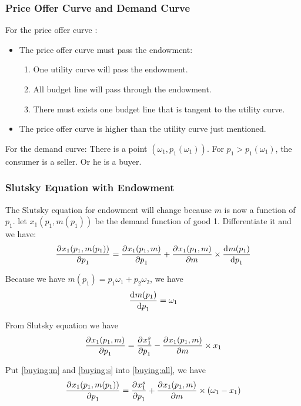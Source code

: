 \subsubsection{Price Offer Curve and Demand Curve}

For the price offer curve :
\begin{itemize}
    \item The price offer curve must pass the endowment:
        \begin{enumerate}
            \item One utility curve will pass the endowment.
            \item All budget line will pass through the endowment.
            \item There must exists one budget line that is tangent to the utility curve.
        \end{enumerate}
    \item The price offer curve is higher than the utility curve just mentioned.
\end{itemize}

For the demand curve: There is a point $(\omega_1, p_1(\omega_1))$. For $p_1 > p_1(\omega_1)$, the consumer is a seller. Or he is a buyer.

\subsubsection{Slutsky Equation with Endowment}

The Slutsky equation for endowment will change because $m$ is now a function of $p_1$. let $x_1(p_1, m(p_1))$ be the demand function of good 1. Differentiate it and we have:
\begin{equation}\label{buying:all}
    \dpd{x_1(p_1, m(p_1))}{p_1} = \dpd{x_1(p_1, m)}{p_1} + \dpd{x_1(p_1, m)}{m} \times \dod{m(p_1)}{p_1}
\end{equation}

Because we have $m(p_1) = p_1 \omega_1 + p_2 \omega_2$, we have
\begin{equation}\label{buying:m}
    \dod{m(p_1)}{p_1} = \omega_1
\end{equation}

From Slutsky equation we have
\begin{equation}\label{buying:s}
    \dpd{x_1(p_1, m)}{p_1} = \dpd{x_1^s}{p_1} - \dpd{x_1(p_1, m)}{m} \times x_1
\end{equation}

Put \eqref{buying:m} and \eqref{buying:s} into \eqref{buying:all}, we have
\begin{equation}
    \dpd{x_1(p_1, m(p_1))}{p_1} = \dpd{x_1^s}{p_1} + \dpd{x_1(p_1, m)}{m} \times (\omega_1 - x_1)
\end{equation}

